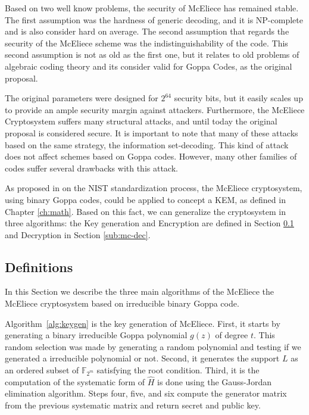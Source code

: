 Based on two well know problems, the security of McEliece has remained stable. The first assumption was the hardness of generic decoding, and it is NP-complete and is also consider hard on average. The second assumption that regards the security of the McEliece scheme was the indistinguishability of the code. This second assumption is not as old as the first one, but it relates to old problems of algebraic coding theory and its consider valid for Goppa Codes, as the original proposal. 

The original parameters were designed for $2^{64}$ security bits, but it easily scales up to provide an ample security margin against attackers. Furthermore, the McEliece Cryptosystem suffers many structural attacks, and until today the original proposal is considered secure. It is important to note that many of these attacks based on the same strategy, the information set-decoding. This kind of attack does not affect schemes based on Goppa codes. However, many other families of codes suffer several drawbacks with this attack. 


As proposed in \cite{bernstein2017classic, bardet2017big} on the NIST standardization process, the McEliece cryptosystem, using binary Goppa codes, could be applied to concept a KEM, as defined in Chapter \ref{ch:math}. Based on this fact, we can generalize the cryptosystem in three algorithms: the Key generation and Encryption are defined in Section \ref{sub:mc-def} and Decryption in Section \ref{sub:mc-dec}.

\subsection{Definitions}
\label{sub:mc-def}
In this Section we describe the three main algorithms of the McEliece the McEliece cryptosystem based on irreducible binary Goppa code. 

Algorithm~\ref{alg:keygen} is the key generation of McEliece. First, it starts by generating a binary irreducible Goppa polynomial $g(z)$ of degree $t$. This random selection was made by generating a random polynomial and testing if we generated a irreducible polynomial or not.  Second, it generates the support $L$ as an ordered subset of $\mathbb{F}_{2^m}$ satisfying the root condition. Third, it is the computation of the systematic form of $\hat{H}$ is done using the Gauss-Jordan elimination algorithm. Steps four, five, and six compute the generator matrix from the previous systematic matrix and return secret and public key.


